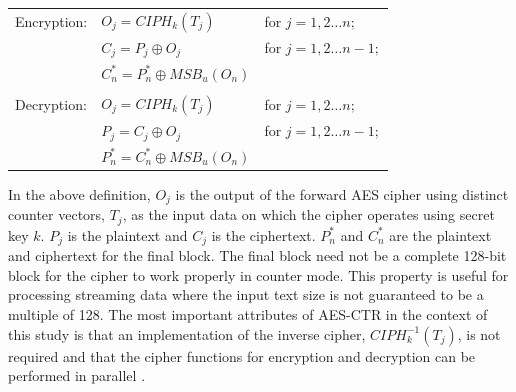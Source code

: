 \documentclass[12pt,journal,compsoc,onecolumn]{IEEEtran}
\begin{document}
\begin{table}[h]
	\centering
	\begin{tabular}{l l l}
	Encryption: & $O_j=CIPH_k(T_j)$ & for $j=1,2\dots n;$\\
		 & $C_j=P_j\oplus O_j$ & for $j=1,2\dots n-1;$\\
		 & $C^*_n=P^*_n\oplus MSB_u(O_n)$ & \\
		 \\
	Decryption: & $O_j=CIPH_k(T_j)$ & for $j=1,2\dots n;$\\
		 & $P_j=C_j\oplus O_j$ & for $j=1,2\dots n-1;$\\
		 & $P^*_n=C^*_n\oplus MSB_u(O_n)$ & 
	\end{tabular}
	\label{tab:ctr}
\end{table}

In the above definition, $O_j$ is the output of the forward AES cipher using distinct counter vectors, $T_j$, as the input data on which the cipher operates using secret key $k$. $P_j$ is the plaintext and $C_j$ is the ciphertext. $P^*_n$ and $C^*_n$ are the plaintext and ciphertext for the final block. The final block need not be a complete 128-bit block for the cipher to work properly in counter mode. This property is useful for processing streaming data where the input text size is not guaranteed to be a multiple of 128\cite{15}\cite{16}. The most important attributes of AES-CTR in the context of this study is that an implementation of the inverse cipher, $CIPH^{-1}_k(T_j)$, is not required and that the cipher functions for encryption and decryption can be performed in parallel \cite{10}.

\end{document}
